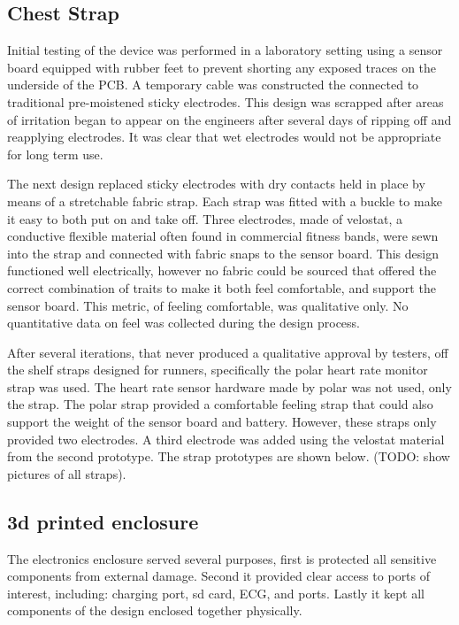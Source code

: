 \subsection {Chest Strap}
Initial testing of the device was performed in a laboratory setting using a sensor board equipped with rubber feet to prevent shorting any exposed traces on the underside of the PCB. A temporary cable was constructed the connected to traditional pre-moistened sticky electrodes. This design was scrapped after areas of irritation began to appear on the engineers after several days of ripping off and reapplying electrodes. It was clear that wet electrodes would not be appropriate for long term use.

The next design replaced sticky electrodes with dry contacts held in place by means of a stretchable fabric strap. Each strap was fitted with a buckle to make it easy to both put on and take off. Three electrodes, made of velostat, a conductive flexible material often found in commercial fitness bands, were sewn into the strap and connected with fabric snaps to the sensor board. This design functioned well electrically, however no fabric could be sourced that offered the correct combination of traits to make it both feel comfortable, and support the sensor board. This metric, of feeling comfortable, was qualitative only. No quantitative data on feel was collected during the design process.

After several iterations, that never produced a qualitative approval by testers, off the shelf straps designed for runners, specifically the polar heart rate monitor strap was used. The heart rate sensor hardware made by polar was not used, only the strap. The polar strap provided a comfortable feeling strap that could also support the weight of the sensor board and battery. However, these straps only provided two electrodes. A third electrode was added using the velostat material from the second prototype. The strap prototypes are shown below. (TODO: show pictures of all straps).

\subsection {3d printed enclosure}
The electronics enclosure served several purposes, first is protected all sensitive components from external damage. Second it provided clear access to ports of interest, including: charging port, sd card, ECG, and  ports. Lastly it kept all components of the design enclosed together physically. 


